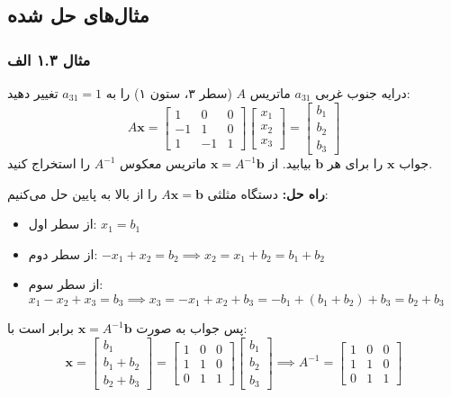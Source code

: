 \documentclass[12pt, a4paper]{book}
\begin{document}
	\subsection*{مثال‌های حل شده}
	\subsubsection*{مثال ۱.۳ الف}
	درایه جنوب غربی $a_{31}$ ماتریس $A$ (سطر ۳، ستون ۱) را به $a_{31}=1$ تغییر دهید:
	\[ A\mathbf{x} = \begin{bmatrix} 1 & 0 & 0 \\ -1 & 1 & 0 \\ 1 & -1 & 1 \end{bmatrix} \begin{bmatrix} x_1 \\ x_2 \\ x_3 \end{bmatrix} = \begin{bmatrix} b_1 \\ b_2 \\ b_3 \end{bmatrix} \]
	جواب $\mathbf{x}$ را برای هر $\mathbf{b}$ بیابید. از $\mathbf{x}=A^{-1}\mathbf{b}$ ماتریس معکوس $A^{-1}$ را استخراج کنید.
	
	\textbf{راه حل:} دستگاه مثلثی $A\mathbf{x}=\mathbf{b}$ را از بالا به پایین حل می‌کنیم:
	\begin{itemize}
		\item از سطر اول: $x_1 = b_1$
		\item از سطر دوم: $-x_1+x_2=b_2 \implies x_2 = x_1+b_2 = b_1+b_2$
		\item از سطر سوم: $x_1-x_2+x_3=b_3 \implies x_3 = -x_1+x_2+b_3 = -b_1+(b_1+b_2)+b_3=b_2+b_3$
	\end{itemize}
	پس جواب به صورت $\mathbf{x}=A^{-1}\mathbf{b}$ برابر است با:
	\[ \mathbf{x} = \begin{bmatrix} b_1 \\ b_1+b_2 \\ b_2+b_3 \end{bmatrix} = \begin{bmatrix} 1 & 0 & 0 \\ 1 & 1 & 0 \\ 0 & 1 & 1 \end{bmatrix} \begin{bmatrix} b_1 \\ b_2 \\ b_3 \end{bmatrix} \implies A^{-1} = \begin{bmatrix} 1 & 0 & 0 \\ 1 & 1 & 0 \\ 0 & 1 & 1 \end{bmatrix} \]
	
\end{document}
